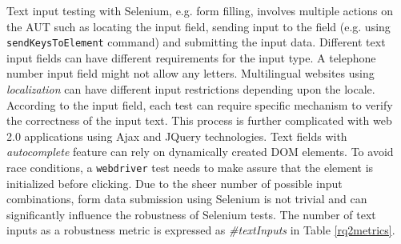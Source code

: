 Text input testing with Selenium, e.g. form filling, involves multiple actions on the AUT such as locating the input field, sending input to the field (e.g. using \texttt{sendKeysToElement} command) and submitting the input data. Different text input fields can have different requirements for the input type. A telephone number input field might not allow any letters. Multilingual websites using \textit{localization} can have different input restrictions depending upon the locale. According to the input field, each test can require specific mechanism to verify the correctness of the input text. This process is further complicated with web 2.0 applications using Ajax and JQuery technologies. Text fields with \textit{autocomplete} feature can rely on dynamically created DOM elements. To avoid race conditions, a \texttt{webdriver} test needs to make assure that the element is initialized before clicking. Due to the sheer number of possible input combinations, form data submission using Selenium is not trivial and can significantly influence the robustness of Selenium tests. The number of text inputs as a robustness metric is expressed as \textit{\#textInputs} in Table \ref{rq2metrics}. 
\begin{center}
\begin{table}
\centering
{}
\caption{Overview of the robustness metrics. First part shows actions, second part shows locator requests}
\label{rq2metrics}
\end{table}
\end{center}
